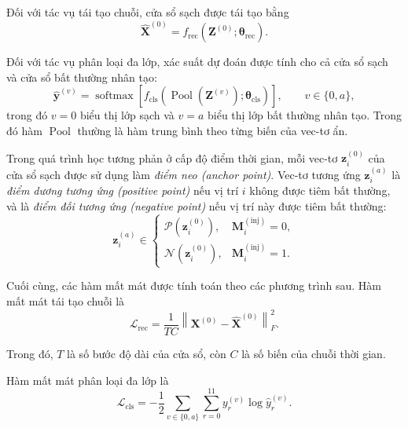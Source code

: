 Đối với tác vụ tái tạo chuỗi, cửa sổ sạch được tái tạo bằng
\begin{equation}
\widehat{\mathbf{X}}^{(0)}
=
f_{\mathrm{rec}}
\left(
\mathbf{Z}^{(0)};
\boldsymbol{\theta}_{\mathrm{rec}}
\right).
\end{equation}

Đối với tác vụ phân loại đa lớp, xác suất dự đoán được tính cho cả cửa sổ sạch và cửa sổ bất thường nhân tạo:
\begin{equation}
\widehat{\mathbf{y}}^{(v)}
=
\operatorname{softmax}
\left[
f_{\mathrm{cls}}
\left(
\operatorname{Pool}\left(\mathbf{Z}^{(v)}\right);
\boldsymbol{\theta}_{\mathrm{cls}}
\right)
\right],
\qquad
v\in\{0,a\},
\end{equation}
trong đó \(v=0\) biểu thị lớp sạch và \(v=a\) biểu thị lớp bất thường nhân tạo. Trong đó hàm \(\operatorname{Pool}\) thường là hàm trung bình theo từng biến của vec-tơ ẩn.

Trong quá trình học tương phản ở cấp độ điểm thời gian, mỗi vec-tơ
\(\mathbf{z}^{(0)}_{i}\) của cửa sổ sạch được sử dụng làm \textit{điểm neo (anchor point)}. Vec-tơ tương ứng \(\mathbf{z}^{(a)}_{i}\) là \textit{điểm dương tương ứng (positive point)} nếu vị trí \(i\) không được tiêm bất thường, và là \textit{điểm đối tương ứng (negative point)} nếu vị trí này được tiêm bất thường:
\begin{equation}
\mathbf{z}^{(a)}_{i}
\in
\begin{cases}
\mathcal{P}\left(\mathbf{z}^{(0)}_{i}\right),
& \mathbf{M}^{(\mathrm{inj})}_{i}=0,
\\
\mathcal{N}\left(\mathbf{z}^{(0)}_{i}\right),
& \mathbf{M}^{(\mathrm{inj})}_{i}=1.
\end{cases}
\end{equation}

Cuối cùng, các hàm mất mát được tính toán theo các phương trình sau. Hàm mất mát tái tạo chuỗi là
\begin{equation}
\mathcal{L}_{\mathrm{rec}}
=
\frac{1}{TC}
\left\|
\mathbf{X}^{(0)}
-
\widehat{\mathbf{X}}^{(0)}
\right\|_F^2.
\end{equation}

Trong đó, \(T\) là số bước độ dài của cửa sổ, còn \(C\) là số biến của chuỗi thời gian.

Hàm mất mát phân loại đa lớp là
\begin{equation}
\mathcal{L}_{\mathrm{cls}}
=
-\frac{1}{2}
\sum_{v\in\{0,a\}}
\sum_{r=0}^{11}
y^{(v)}_{r}
\log
\widehat{y}^{(v)}_{r}.
\end{equation}

